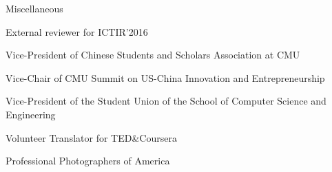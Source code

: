 \documentclass{resume} %
\begin{document}
\begin{rSection}{Miscellaneous}
\begin{rSubsection}{}{}{}{}
\item External reviewer for ICTIR'2016
\item Vice-President of Chinese Students and Scholars Association at CMU
\item Vice-Chair of CMU Summit on US-China Innovation and Entrepreneurship
\item Vice-President of the Student Union of the School of Computer Science and Engineering
\item Volunteer Translator for TED\&Coursera
\item Professional Photographers of America
\end{rSubsection}
\end{rSection}
\end{document}
